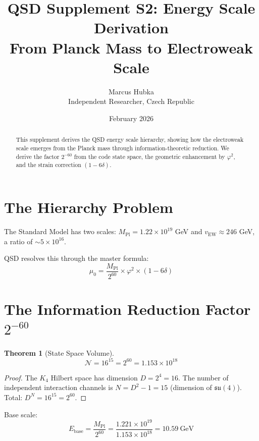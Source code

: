 \documentclass[11pt,a4paper]{article}
\title{\textbf{QSD Supplement S2: Energy Scale Derivation}\\[0.5em]
\large From Planck Mass to Electroweak Scale}
\author{Marcus Hubka\\
\small Independent Researcher, Czech Republic}
\date{February 2026}
\newtheorem{theorem}{Theorem}[section]
\theoremstyle{definition}
\newcommand{\dgeo}{\delta}
\newcommand{\Mpl}{M_{\text{Pl}}}
\newcommand{\murad}{\mu_0}
\begin{document}
\maketitle

\begin{abstract}
This supplement derives the QSD energy scale hierarchy, showing how the electroweak scale emerges from the Planck mass through information-theoretic reduction. We derive the factor $2^{-60}$ from the code state space, the geometric enhancement by $\varphi^2$, and the strain correction $(1-6\dgeo)$.
\end{abstract}

\tableofcontents

\section{The Hierarchy Problem}

The Standard Model has two scales: $\Mpl = 1.22 \times 10^{19}$ GeV and $v_{\text{EW}} \approx 246$ GeV, a ratio of $\sim 5 \times 10^{16}$.

QSD resolves this through the master formula:
\begin{equation}
\boxed{\murad = \frac{\Mpl}{2^{60}} \times \varphi^2 \times (1 - 6\dgeo)}
\end{equation}

\section{The Information Reduction Factor $2^{-60}$}

\begin{theorem}[State Space Volume]
\begin{equation}
\mathcal{N} = 16^{15} = 2^{60} = 1.153 \times 10^{18}
\end{equation}
\end{theorem}

\begin{proof}
The $K_4$ Hilbert space has dimension $D = 2^4 = 16$. The number of independent interaction channels is $N = D^2 - 1 = 15$ (dimension of $\mathfrak{su}(4)$). Total: $D^N = 16^{15} = 2^{60}$.
\end{proof}

Base scale:
\begin{equation}
E_{\text{base}} = \frac{\Mpl}{2^{60}} = \frac{1.221 \times 10^{19}}{1.153 \times 10^{18}} = 10.59~\text{GeV}
\end{equation}
\end{document}
